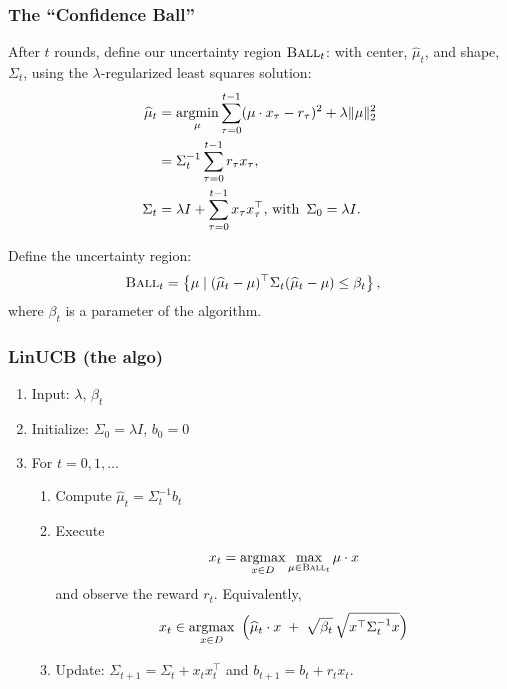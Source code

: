 \documentclass[aspectratio=169]{beamer}
\begin{document}
\begin{frame}
\frametitle{The ``Confidence Ball''}

After $t$ rounds, define our uncertainty region 
$\textsc{Ball}_t$: with center, $\widehat{\mu}_t$, and shape,
$\Sigma_t$, using the $\lambda$-regularized least squares solution:
\begin{align*}%
\widehat{\mu}_t &= \argmin_{\mu} \sum_{\tau = 0}^{t-1}
( \mu \cdot x_\tau - r_\tau )^2 + \lambda\|\mu\|_2^2\\
&= \Sigma_t^{-1}\sum_{\tau = 0}^{t-1}r_\tau x_\tau,\\
\Sigma_t &= \lambda I + \sum_{\tau = 0}^{t-1}x_\tau x_\tau^\top,
\, \mathrm{with } \, \, \, \Sigma_0 = \lambda I.
\end{align*}

Define the uncertainty region:
\begin{align*}
\textsc{Ball}_{t} &= \left\{ \mu \mid
(\widehat \mu_t - \mu)^\top\Sigma_t(\widehat \mu_t - \mu)
\leq \beta_t \right\},  
\end{align*}
where $\beta_t$ is a parameter of the algorithm.

\end{frame}

\begin{frame}
  
\frametitle{LinUCB (the algo)}

\begin{enumerate}
\item Input: $\lambda$, $\beta_t$
\item Initialize: $\Sigma_0 = \lambda I$, $b_0 = 0$
  \item For $t=0,1, \ldots$
    \begin{enumerate} 
    \item Compute $\widehat{\mu}_t = \Sigma_t^{-1} b_t$
    \item Execute 
    \[
    x_t = \operatorname*{argmax}_{x\in D}\max_{\mu\in \textsc{Ball}_t} \mu\cdot x 
    \]
    and observe the reward $r_t$.
    Equivalently,
    \[
    x_t \in \operatorname*{argmax}_{x\in D}\ \Big( \widehat{\mu}_t\cdot x \;+\; \sqrt{\beta_t}\,\sqrt{x^\top \Sigma_t^{-1}x}\Big)
    \]   
  \item Update: $\Sigma_{t+1} = \Sigma_t + x_t x_t^\top$ and $b_{t+1} = b_t + r_t x_t$.
  \end{enumerate}
\end{enumerate}

\end{frame}
\end{document}
